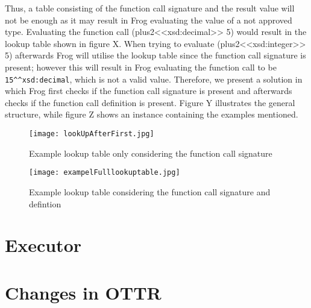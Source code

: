 \para
Thus, a table consisting of the function call signature and the result value will not be enough as it may result in Frog evaluating the value of a not approved type. Evaluating the function call (plus2<<xsd:decimal>> 5) would result in the lookup table shown in figure X. When trying to evaluate (plus2<<xsd:integer>> 5) afterwards Frog will utilise the lookup table since the function call signature is present; however this will result in Frog evaluating the function call to be \lstinline{15^^xsd:decimal}, which is not a valid value. Therefore, we present a solution in which Frog first checks if the function call signature is present and afterwards checks if the function call definition is present. Figure Y illustrates the general structure, while figure Z shows an instance containing the examples mentioned. 

\begin{figure}
    \centering
    \begin{minipage}{.5\textwidth}
      \centering
      \texttt{[image: lookUpAfterFirst.jpg]}
      \caption{Example lookup table only considering the function call signature}
      \label{fig:lookUpAfterFirst}
    \end{minipage}%
    \begin{minipage}{.5\textwidth}
      \centering
      \texttt{[image: exampelFulllookuptable.jpg]}
      \caption{Example lookup table considering the function call signature and defintion}
      \label{fig:exampelFulllookuptable}
    \end{minipage}
\end{figure}

\section{Executor}

\section{Changes in OTTR}

